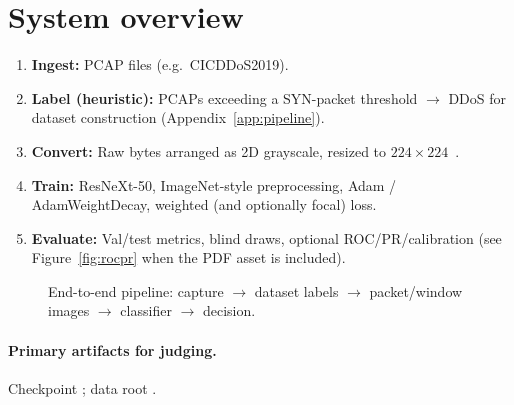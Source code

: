 \documentclass[11pt,a4paper]{article}
\begin{document}
\section{System overview}

\begin{enumerate}[leftmargin=*]
  \item \textbf{Ingest:} PCAP files (e.g.\ CICDDoS2019).
  \item \textbf{Label (heuristic):} PCAPs exceeding a SYN-packet threshold $\rightarrow$ DDoS for dataset construction (Appendix~\ref{app:pipeline}).
  \item \textbf{Convert:} Raw bytes arranged as 2D grayscale, resized to $224{\times}224$~\cite{bazzi2020resnet}.
  \item \textbf{Train:} ResNeXt-50, ImageNet-style preprocessing, Adam / AdamWeightDecay, weighted (and optionally focal) loss.
  \item \textbf{Evaluate:} Val/test metrics, blind draws, optional ROC/PR/calibration (see Figure~\ref{fig:rocpr} when the PDF asset is included).
\end{enumerate}

\begin{figure}[ht]
  \centering
  \caption{End-to-end pipeline: capture $\rightarrow$ dataset labels $\rightarrow$ packet/window images $\rightarrow$ classifier $\rightarrow$ decision.}
  \label{fig:pipeline}
\end{figure}

\paragraph{Primary artifacts for judging.}
Checkpoint ; data root .
\end{document}
